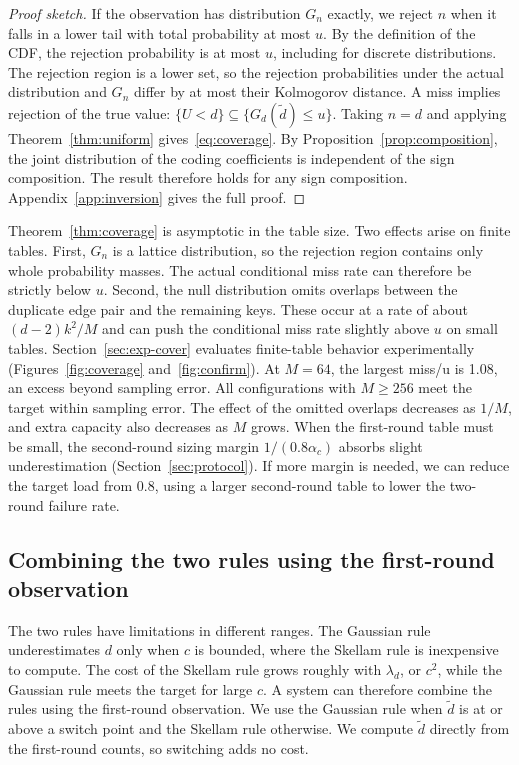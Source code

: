 \begin{proof}[Proof sketch]
If the observation has distribution $G_n$ exactly, we reject $n$ when it falls in a lower tail with total probability at most $u$. By the definition of the CDF, the rejection probability is at most $u$, including for discrete distributions. The rejection region is a lower set, so the rejection probabilities under the actual distribution and $G_n$ differ by at most their Kolmogorov distance. A miss implies rejection of the true value: $\{U<d\}\subseteq\{G_d(\widetilde d)\le u\}$. Taking $n=d$ and applying Theorem~\ref{thm:uniform} gives~\eqref{eq:coverage}. By Proposition~\ref{prop:composition}, the joint distribution of the coding coefficients is independent of the sign composition. The result therefore holds for any sign composition. Appendix~\ref{app:inversion} gives the full proof.
\end{proof}

Theorem~\ref{thm:coverage} is asymptotic in the table size. Two effects arise on finite tables. First, $G_n$ is a lattice distribution, so the rejection region contains only whole probability masses. The actual conditional miss rate can therefore be strictly below $u$. Second, the null distribution omits overlaps between the duplicate edge pair and the remaining keys. These occur at a rate of about $(d-2)k^2/M$ and can push the conditional miss rate slightly above $u$ on small tables. Section~\ref{sec:exp-cover} evaluates finite-table behavior experimentally (Figures~\ref{fig:coverage} and~\ref{fig:confirm}). At $M=64$, the largest miss/u is 1.08, an excess beyond sampling error. All configurations with $M\ge256$ meet the target within sampling error. The effect of the omitted overlaps decreases as $1/M$, and extra capacity also decreases as $M$ grows. When the first-round table must be small, the second-round sizing margin $1/(0.8\alpha_c)$ absorbs slight underestimation (Section~\ref{sec:protocol}). If more margin is needed, we can reduce the target load from 0.8, using a larger second-round table to lower the two-round failure rate.

\subsection{Combining the two rules using the first-round observation}\label{sec:switch}
The two rules have limitations in different ranges. The Gaussian rule underestimates $d$ only when $c$ is bounded, where the Skellam rule is inexpensive to compute. The cost of the Skellam rule grows roughly with $\lambda_d$, or $c^2$, while the Gaussian rule meets the target for large $c$. A system can therefore combine the rules using the first-round observation. We use the Gaussian rule when $\widetilde d$ is at or above a switch point and the Skellam rule otherwise. We compute $\widetilde d$ directly from the first-round counts, so switching adds no cost.

